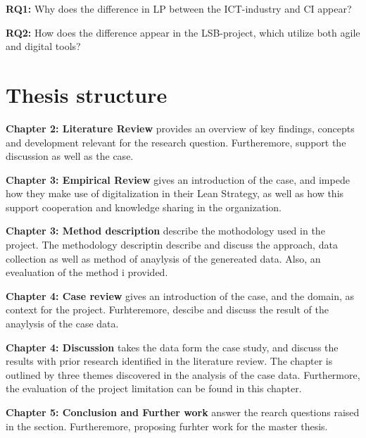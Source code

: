 {\noindent \bf RQ1:} Why does the difference in LP between the ICT-industry and CI appear?

{\noindent \bf RQ2:} How does the difference appear in the LSB-project, which utilize both agile and digital tools?

\section{Thesis structure} \label{sec:thesis}

{\noindent \bf Chapter 2: Literature Review} provides an overview of key findings, concepts and development relevant for the research question. Furtheremore, support the discussion as well as the case. 

{\noindent \bf Chapter 3: Empirical Review} gives an introduction of the case, and impede how they make use of digitalization in their Lean Strategy, as well as how this support cooperation and knowledge sharing in the organization.

{\noindent \bf Chapter 3: Method description} describe the mothodology used in the project. The methodology descriptin describe and discuss the approach, data collection as well as method of anaylysis of the genereated data. Also, an evealuation of the method i provided.

{\noindent \bf Chapter 4: Case review} gives an introduction of the case, and the domain, as context for the project. Furhteremore, descibe and discuss the result of the anaylysis of the case data. 

{\noindent \bf Chapter 4: Discussion} takes the data form the case study, and discuss the results with prior research identified in the literature review. The chapter is outlined by three themes discovered in the analysis of the case data. Furthermore, the evaluation of the project limitation can be found in this chapter.

{\noindent \bf Chapter 5: Conclusion and Further work} answer the rearch questions raised in the  section. Furtheremore, proposing furhter work for the master thesis.


\cleardoublepage